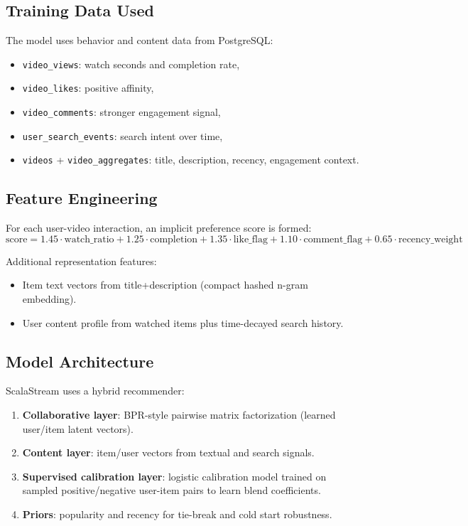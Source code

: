 \documentclass[11pt,a4paper]{article}
\begin{document}
\subsection{Training Data Used}
The model uses behavior and content data from PostgreSQL:
\begin{itemize}[leftmargin=1.2em]
  \item \texttt{video\_views}: watch seconds and completion rate,
  \item \texttt{video\_likes}: positive affinity,
  \item \texttt{video\_comments}: stronger engagement signal,
  \item \texttt{user\_search\_events}: search intent over time,
  \item \texttt{videos} + \texttt{video\_aggregates}: title, description, recency, engagement context.
\end{itemize}

\subsection{Feature Engineering}
For each user-video interaction, an implicit preference score is formed:
\[
\text{score} = 1.45\cdot\text{watch\_ratio}
+ 1.25\cdot\text{completion}
+ 1.35\cdot\text{like\_flag}
+ 1.10\cdot\text{comment\_flag}
+ 0.65\cdot\text{recency\_weight}
\]

Additional representation features:
\begin{itemize}[leftmargin=1.2em]
  \item Item text vectors from title+description (compact hashed n-gram embedding).
  \item User content profile from watched items plus time-decayed search history.
\end{itemize}

\subsection{Model Architecture}
ScalaStream uses a hybrid recommender:
\begin{enumerate}[leftmargin=1.4em]
  \item \textbf{Collaborative layer}: BPR-style pairwise matrix factorization (learned user/item latent vectors).
  \item \textbf{Content layer}: item/user vectors from textual and search signals.
  \item \textbf{Supervised calibration layer}: logistic calibration model trained on sampled positive/negative user-item pairs to learn blend coefficients.
  \item \textbf{Priors}: popularity and recency for tie-break and cold start robustness.
\end{enumerate}
\end{document}
